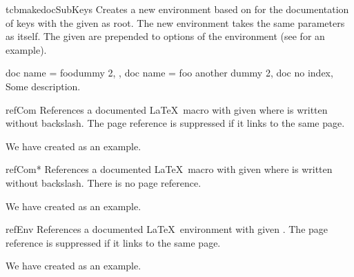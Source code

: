 \begin{docCommand}[doc new and updated={2020-04-22}{2023-12-01}]{tcbmakedocSubKeys}{}
  Creates a new environment  based on  for the
  documentation of keys with the given  as root.
  The new environment  takes the same para\-meters as  itself.
  The given  are prepended to options of the  environment
  (see  for an example).
\begin{dispExample}

\begin{docFooKeys}[
    doc parameter   = {=\meta{nothing}},
    doc description = {no default, initially empty},
  ]
  {
    {
      doc name = foodummy 2,
    },
    {
      doc name = foo another dummy 2,
      doc no index,
    }
  }
Some description.
\end{docFooKeys}
\end{dispExample}
\end{docCommand}


\clearpage

\begin{docCommand}{refCom}{}
  References a documented \LaTeX\ macro with given  where  is
  written without backslash. The page reference is suppressed if it links
  to the same page.
\begin{dispExample}
We have created  as an example.
\end{dispExample}
\end{docCommand}

\begin{docCommand}{refCom*}{}
  References a documented \LaTeX\ macro with given  where  is
  written without backslash. There is no page reference.
\begin{dispExample}
We have created  as an example.
\end{dispExample}
\end{docCommand}


\begin{docCommand}{refEnv}{}
  References a documented \LaTeX\ environment with given .
  The page reference is suppressed if it links to the same page.
\begin{dispExample}
We have created  as an example.
\end{dispExample}
\end{docCommand}

